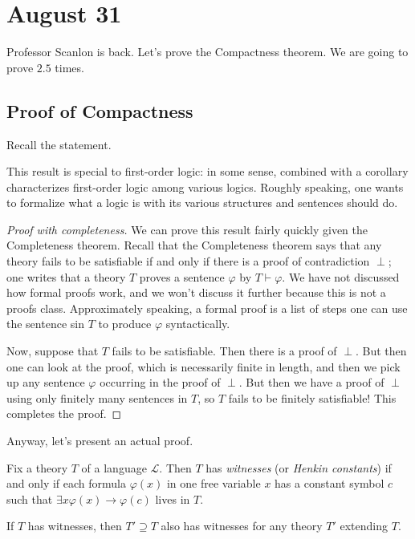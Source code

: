 \documentclass[../notes.tex]{subfiles}
\begin{document}
\section{August 31}

Professor Scanlon is back. Let's prove the Compactness theorem. We are going to prove $2.5$ times.

\subsection{Proof of Compactness}
Recall the statement.
\compact*
\begin{remark}
	This result is special to first-order logic: in some sense,  combined with a corollary characterizes first-order logic among various logics. Roughly speaking, one wants to formalize what a logic is with its various structures and sentences should do.
\end{remark}
\begin{proof}[Proof with completeness]
	We can prove this result fairly quickly given the Completeness theorem. Recall that the Completeness theorem says that any theory fails to be satisfiable if and only if there is a proof of contradiction $\perp$; one writes that a theory $T$ proves a sentence $\varphi$ by $T\vdash\varphi$. We have not discussed how formal proofs work, and we won't discuss it further because this is not a proofs class. Approximately speaking, a formal proof is a list of steps one can use the sentence sin $T$ to produce $\varphi$ syntactically.

	Now, suppose that $T$ fails to be satisfiable. Then there is a proof of $\perp$. But then one can look at the proof, which is necessarily finite in length, and then we pick up any sentence $\varphi$ occurring in the proof of $\perp$. But then we have a proof of $\perp$ using only finitely many sentences in $T$, so $T$ fails to be finitely satisfiable! This completes the proof.
\end{proof}
Anyway, let's present an actual proof.
\begin{definition}[witness]
	Fix a theory $T$ of a language $\mathcal L$. Then $T$ has \textit{witnesses} (or \textit{Henkin constants}) if and only if each formula $\varphi(x)$ in one free variable $x$ has a constant symbol $c$ such that $\exists x\varphi(x)\to\varphi(c)$ lives in $T$.
\end{definition}
\begin{remark}
	If $T$ has witnesses, then $T'\supseteq T$ also has witnesses for any theory $T'$ extending $T$.
\end{remark}
\end{document}
